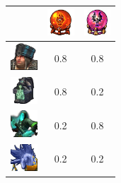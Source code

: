 \documentclass[24pt,pdf,hyperref={unicode}]{beamer}
\newcommand{\da}{\includegraphics[width=1cm]{HOMM5/dark.jpg}}
\newcommand{\de}{\includegraphics[width=1cm]{HOMM5/destructive.jpg}}
\newcommand{\pe}{\includegraphics[width=1cm]{HOMM5/peasant.jpg}}
\newcommand{\wt}{\includegraphics[width=1cm]{HOMM5/wraith.jpg}}
\newcommand{\ga}{\includegraphics[width=1cm]{HOMM5/garg.jpg}}
\newcommand{\un}{\includegraphics[width=1cm]{HOMM5/unicorn.jpg}}
\begin{document}
\begin{frame}
\begin{tabular}{c |c c}
    & \de & \da \\
\hline
\pe & 0.8 & 0.8 \\
\ga & 0.8 & 0.2 \\
\wt & 0.2 & 0.8 \\
\un & 0.2 & 0.2 
\end{tabular}
\end{frame}
\end{document}
